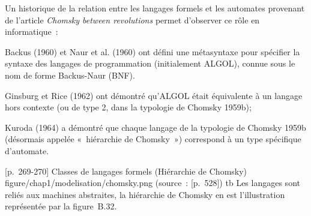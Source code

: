 {Un historique de la relation entre les langages formels et les automates provenant de l'article \textit{Chomsky between revolutions} permet d'observer ce rôle en informatique~:
{
    \item [][---] Backus (1960) et Naur et al. (1960) ont défini une métasyntaxe pour spécifier la syntaxe des langages de programmation (initialement ALGOL), connue sous le nom de forme Backus-Naur (BNF).
    \item [][---] Ginsburg et Rice (1962) ont démontré qu'ALGOL était équivalente à un langage hors contexte (ou de type 2, dans la typologie de Chomsky 1959b); \elide
    \item [][---] Kuroda (1964) a démontré que chaque langage de la typologie de Chomsky 1959b (désormais appelée «~hiérarchie de Chomsky~») correspond à un type spécifique d'automate.
}
{[p.~269-270]}
\figms
{Classes de langages formels (Hiérarchie de Chomsky)}
{figure/chap1/modelisation/chomsky.png}
{(source~: [p.~528])}
{}{}{tb}
Les langages sont reliés aux machines abstraites, la hiérarchie de Chomsky en est l'illustration représentée par la figure~B.32.
}{}

